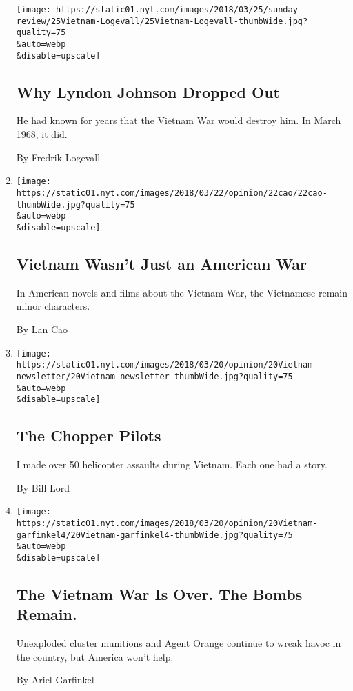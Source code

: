 \begin{enumerate}
  \texttt{[image: https://static01.nyt.com/images/2018/03/25/sunday-review/25Vietnam-Logevall/25Vietnam-Logevall-thumbWide.jpg?quality=75\\\&auto=webp\\\&disable=upscale]}

  \hypertarget{why-lyndon-johnson-dropped-out}{%
  \subsection{Why Lyndon Johnson Dropped
  Out}\label{why-lyndon-johnson-dropped-out}}

  He had known for years that the Vietnam War would destroy him. In
  March 1968, it did.

  By Fredrik Logevall
\item
  \href{/2018/03/22/opinion/vietnam-wasnt-just-an-american-war.html}{}

  \texttt{[image: https://static01.nyt.com/images/2018/03/22/opinion/22cao/22cao-thumbWide.jpg?quality=75\\\&auto=webp\\\&disable=upscale]}

  \hypertarget{vietnam-wasnt-just-an-american-war}{%
  \subsection{Vietnam Wasn't Just an American
  War}\label{vietnam-wasnt-just-an-american-war}}

  In American novels and films about the Vietnam War, the Vietnamese
  remain minor characters.

  By Lan Cao
\item
  \href{/2018/03/20/opinion/the-chopper-pilots.html}{}

  \texttt{[image: https://static01.nyt.com/images/2018/03/20/opinion/20Vietnam-newsletter/20Vietnam-newsletter-thumbWide.jpg?quality=75\\\&auto=webp\\\&disable=upscale]}

  \hypertarget{the-chopper-pilots}{%
  \subsection{The Chopper Pilots}\label{the-chopper-pilots}}

  I made over 50 helicopter assaults during Vietnam. Each one had a
  story.

  By Bill Lord
\item
  \href{/2018/03/20/opinion/vietnam-war-agent-orange-bombs.html}{}

  \texttt{[image: https://static01.nyt.com/images/2018/03/20/opinion/20Vietnam-garfinkel4/20Vietnam-garfinkel4-thumbWide.jpg?quality=75\\\&auto=webp\\\&disable=upscale]}

  \hypertarget{the-vietnam-war-is-over-the-bombs-remain}{%
  \subsection{The Vietnam War Is Over. The Bombs
  Remain.}\label{the-vietnam-war-is-over-the-bombs-remain}}

  Unexploded cluster munitions and Agent Orange continue to wreak havoc
  in the country, but America won't help.

  By Ariel Garfinkel
\end{enumerate}

